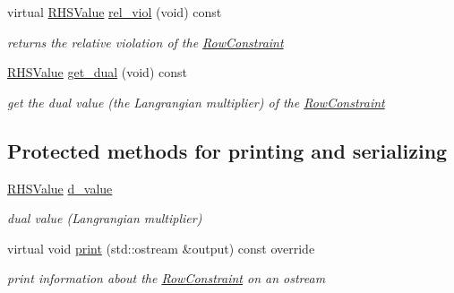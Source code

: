 \begin{Indent}
\begin{DoxyCompactItemize}
virtual \mbox{\hyperlink{class_s_m_spp__di__unipi__it_1_1_row_constraint_a8813536ab3b13a81c8e83a999ade3bd8}{R\+H\+S\+Value}} \mbox{\hyperlink{class_s_m_spp__di__unipi__it_1_1_row_constraint_ab62e87cff922e3aa37b8a0b5644b4ecc}{rel\+\_\+viol}} (void) const
\begin{DoxyCompactList}\small\item\em returns the relative violation of the \mbox{\hyperlink{class_s_m_spp__di__unipi__it_1_1_row_constraint}{Row\+Constraint}} \end{DoxyCompactList}\item 
\mbox{\label{class_s_m_spp__di__unipi__it_1_1_row_constraint_a9ebe9aea6b30c79e7876a6d06a67c773}} 
\mbox{\hyperlink{class_s_m_spp__di__unipi__it_1_1_row_constraint_a8813536ab3b13a81c8e83a999ade3bd8}{R\+H\+S\+Value}} \mbox{\hyperlink{class_s_m_spp__di__unipi__it_1_1_row_constraint_a9ebe9aea6b30c79e7876a6d06a67c773}{get\+\_\+dual}} (void) const
\begin{DoxyCompactList}\small\item\em get the dual value (the Langrangian multiplier) of the \mbox{\hyperlink{class_s_m_spp__di__unipi__it_1_1_row_constraint}{Row\+Constraint}} \end{DoxyCompactList}\end{DoxyCompactItemize}
\end{Indent}
\subsection*{Protected methods for printing and serializing}
\begin{DoxyCompactItemize}
\item 
\mbox{\label{class_s_m_spp__di__unipi__it_1_1_row_constraint_a0d53564baaf3dead573b8ed49a61fbfd}} 
\mbox{\hyperlink{class_s_m_spp__di__unipi__it_1_1_row_constraint_a8813536ab3b13a81c8e83a999ade3bd8}{R\+H\+S\+Value}} \mbox{\hyperlink{class_s_m_spp__di__unipi__it_1_1_row_constraint_a0d53564baaf3dead573b8ed49a61fbfd}{d\+\_\+value}}
\begin{DoxyCompactList}\small\item\em dual value (Langrangian multiplier) \end{DoxyCompactList}\item 
\mbox{\label{class_s_m_spp__di__unipi__it_1_1_row_constraint_a59a9fcbf8f9f86d348344b2073644b0e}} 
virtual void \mbox{\hyperlink{class_s_m_spp__di__unipi__it_1_1_row_constraint_a59a9fcbf8f9f86d348344b2073644b0e}{print}} (std\+::ostream \&output) const override
\begin{DoxyCompactList}\small\item\em print information about the \mbox{\hyperlink{class_s_m_spp__di__unipi__it_1_1_row_constraint}{Row\+Constraint}} on an ostream \end{DoxyCompactList}\end{DoxyCompactItemize}
